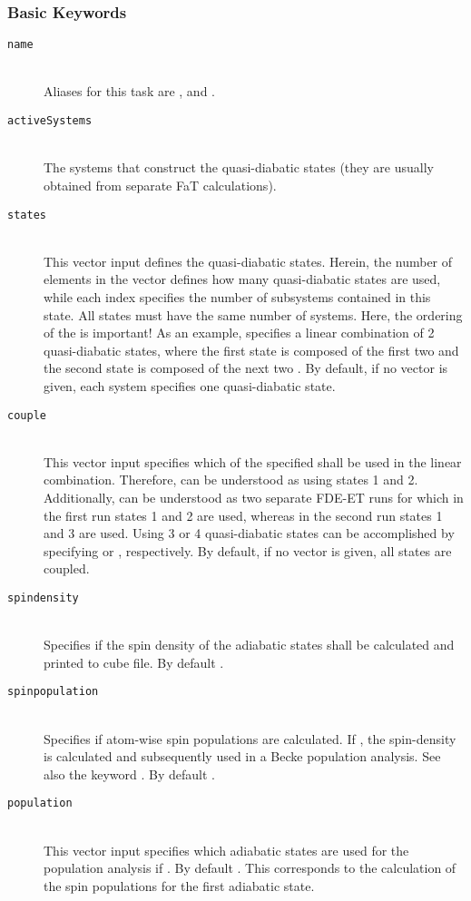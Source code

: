 \subsubsection{Basic Keywords}
\begin{description}
  \item [\texttt{name}]\hfill \\
  Aliases for this task are ,  and .
  \item [\texttt{activeSystems}]\hfill \\
  The systems that construct the quasi-diabatic states (they are usually obtained from separate FaT calculations).
  \item [\texttt{states}]\hfill \\
  This vector input defines the quasi-diabatic states. Herein, the number of elements in the vector defines how many
  quasi-diabatic states are used, while each index specifies the number of subsystems contained in this state. All states must have the same number 
  of systems. Here, the ordering of the  is important! As an example,  specifies a linear combination of 2 quasi-diabatic states, where the first state is composed of the first two  and the second state is composed of the next two .
  By default, if no vector is given, each system specifies one quasi-diabatic state.
  \item [\texttt{couple}]\hfill \\
  This vector input specifies which of the specified  shall be used in the linear combination.
  Therefore,  can be understood as using states 1 and 2. Additionally, 
  can be understood as two separate FDE-ET runs for which in the first run states 1 and 2 are used, whereas in the
  second run states 1 and 3 are used. Using 3 or 4 quasi-diabatic states can be accomplished by specifying
   or , respectively.
  By default, if no vector is given, all states are coupled.
  \item [\texttt{spindensity}]\hfill \\
  Specifies if the spin density of the adiabatic states shall be calculated and printed to cube file. By default .
  \item [\texttt{spinpopulation}]\hfill \\
  Specifies if atom-wise spin populations are calculated. If , the spin-density is calculated and subsequently
  used in a Becke population analysis. See also the keyword . By default .
  \item [\texttt{population}]\hfill \\
  This vector input specifies which adiabatic states are used for the population analysis if . By default . This corresponds to the calculation of the spin populations for the first adiabatic state.
\end{description}
